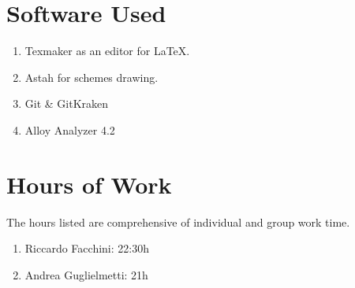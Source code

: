 \section{Software Used}
\begin{enumerate}
\item Texmaker as an editor for \LaTeX.
\item Astah for schemes drawing.
\item Git \& GitKraken
\item Alloy Analyzer 4.2
\end{enumerate}
\section{Hours of Work}
The hours listed are comprehensive of individual and group work time.
\begin{enumerate}
\item Riccardo Facchini: 22:30h
\item Andrea Guglielmetti: 21h
\end{enumerate}